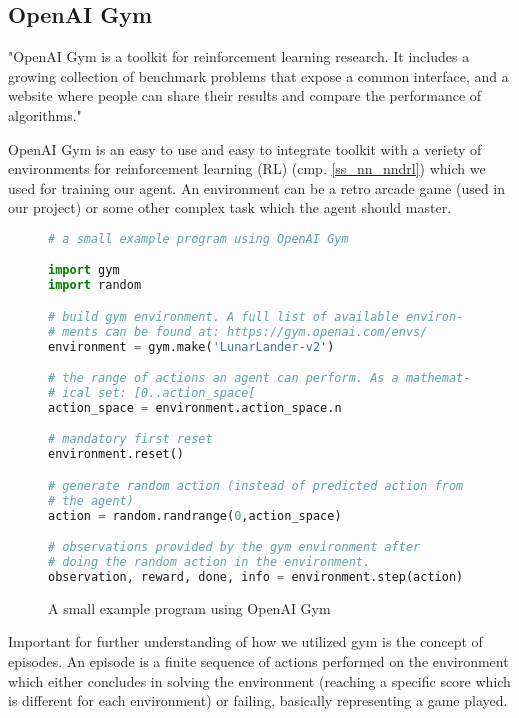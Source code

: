 \subsection{OpenAI Gym}
\label{s_openai_gym}

"OpenAI Gym is a toolkit for reinforcement learning
research. It includes a growing collection of benchmark
problems that expose a common interface, and a website
where people can share their results and compare the
performance of algorithms."\cite{gym}

OpenAI Gym is an easy to use and easy to integrate toolkit
with a veriety of environments for reinforcement learning
(RL) (cmp. \ref{ss_nn_nndrl}) which we used for training
our agent. An environment can be a retro arcade game (used
in our project) or some other complex task which the agent
should master.

\begin{figure}[H]
\begin{mdframed}[style=codebox]
\begin{lstlisting}[language=Python]
# a small example program using OpenAI Gym

import gym
import random

# build gym environment. A full list of available environ-
# ments can be found at: https://gym.openai.com/envs/
environment = gym.make('LunarLander-v2')

# the range of actions an agent can perform. As a mathemat-
# ical set: [0..action_space[
action_space = environment.action_space.n

# mandatory first reset
environment.reset()

# generate random action (instead of predicted action from
# the agent)
action = random.randrange(0,action_space)

# observations provided by the gym environment after
# doing the random action in the environment.
observation, reward, done, info = environment.step(action)

\end{lstlisting}
\end{mdframed}
\caption{A small example program using OpenAI Gym}
\end{figure}

Important for further understanding of how we utilized gym
is the concept of episodes. An episode is a finite sequence
of actions performed on the environment which either
concludes in solving the environment (reaching a specific
score which is different for each environment) or failing,
basically representing a game played.

